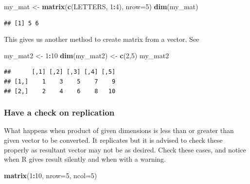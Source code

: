 \documentclass[
]{book}
\newenvironment{Shaded}{\begin{snugshade}}{\end{snugshade}}
\newcommand{\AttributeTok}[1]{\textcolor[rgb]{0.13,0.29,0.53}{#1}}
\newcommand{\DecValTok}[1]{\textcolor[rgb]{0.00,0.00,0.81}{#1}}
\newcommand{\FunctionTok}[1]{\textcolor[rgb]{0.13,0.29,0.53}{\textbf{#1}}}
\newcommand{\NormalTok}[1]{#1}
\newcommand{\OtherTok}[1]{\textcolor[rgb]{0.56,0.35,0.01}{#1}}
\newcommand{\SpecialCharTok}[1]{\textcolor[rgb]{0.81,0.36,0.00}{\textbf{#1}}}
\begin{document}
\begin{Shaded}
\begin{Highlighting}[]
\NormalTok{my\_mat }\OtherTok{\textless{}{-}} \FunctionTok{matrix}\NormalTok{(}\FunctionTok{c}\NormalTok{(LETTERS, }\DecValTok{1}\SpecialCharTok{:}\DecValTok{4}\NormalTok{), }\AttributeTok{nrow=}\DecValTok{5}\NormalTok{)}
\FunctionTok{dim}\NormalTok{(my\_mat)}
\end{Highlighting}
\end{Shaded}

\begin{verbatim}
## [1] 5 6
\end{verbatim}

This gives us another method to create matrix from a vector. See

\begin{Shaded}
\begin{Highlighting}[]
\NormalTok{my\_mat2 }\OtherTok{\textless{}{-}} \DecValTok{1}\SpecialCharTok{:}\DecValTok{10}
\FunctionTok{dim}\NormalTok{(my\_mat2) }\OtherTok{\textless{}{-}} \FunctionTok{c}\NormalTok{(}\DecValTok{2}\NormalTok{,}\DecValTok{5}\NormalTok{)}
\NormalTok{my\_mat2}
\end{Highlighting}
\end{Shaded}

\begin{verbatim}
##      [,1] [,2] [,3] [,4] [,5]
## [1,]    1    3    5    7    9
## [2,]    2    4    6    8   10
\end{verbatim}

\hypertarget{have-a-check-on-replication}{%
\subsubsection*{Have a check on replication}\label{have-a-check-on-replication}}

What happens when product of given dimensions is less than or greater than given vector to be converted. It replicates but it is advised to check these properly as resultant vector may not be as desired. Check these cases, and notice when R gives result silently and when with a warning.

\begin{Shaded}
\begin{Highlighting}[]
\FunctionTok{matrix}\NormalTok{(}\DecValTok{1}\SpecialCharTok{:}\DecValTok{10}\NormalTok{, }\AttributeTok{nrow=}\DecValTok{5}\NormalTok{, }\AttributeTok{ncol=}\DecValTok{5}\NormalTok{)}
\end{Highlighting}
\end{Shaded}
\end{document}
